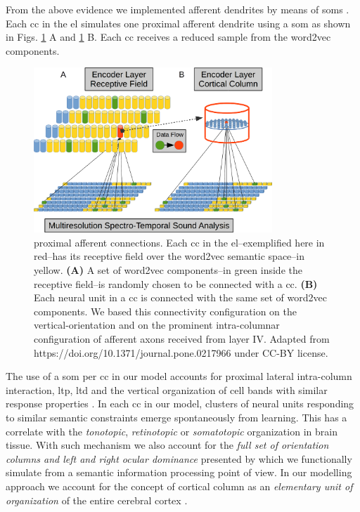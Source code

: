 {From the above evidence we implemented afferent dendrites by means of \glspl{som} \cite{Kohonen:1988:SFT:65669.104428, Kohonen1989SelforganizationAA}.
Each \gls{cc} in the \gls{el} simulates one proximal afferent dendrite using a \gls{som} as shown in Figs. \ref{fig:EncoderProximalConnections} A and \ref{fig:EncoderProximalConnections} B. Each \gls{cc} receives a reduced sample from the word2vec components.

\begin{figure}[ht!]
    \centering
    \includegraphics[width=0.8\textwidth]{EncoderProximalConnections.png}
    \caption{ proximal afferent connections. Each \gls{cc} in the \gls{el}--exemplified here in red--has its receptive field over the word2vec semantic space--in yellow.
    \textbf{(A)} A set of word2vec components--in green inside the receptive field--is randomly chosen to be connected with a \gls{cc}.
    \textbf{(B)} Each neural unit in a \gls{cc} is connected with the same set of word2vec components. We based this connectivity configuration on the vertical-orientation and on the prominent intra-columnar configuration of afferent axons received from layer IV.
    Adapted from https://doi.org/10.1371/journal.pone.0217966 under CC-BY license.}
    \label{fig:EncoderProximalConnections}
\end{figure}

The use of a \gls{som} per \gls{cc} in our model accounts for 
proximal lateral intra-column interaction, \gls{ltp}, \gls{ltd} and
the vertical organization of cell bands with similar response properties \cite{mountcastle_1955,Haueis2016}.
In each \gls{cc} in our model, clusters of neural units responding to similar semantic constraints emerge spontaneously from learning.
This has a correlate with the \emph{tonotopic}, \emph{retinotopic} or \emph{somatotopic} organization in brain tissue.
With such mechanism we also account for the \emph{full set of orientation columns and left and right ocular dominance} presented by \cite{doi:10.1002/cne.901580305} which we functionally simulate from a semantic information processing point of view.
In our modelling approach we account for the concept of cortical column as an \emph{elementary unit of organization} of the entire cerebral cortex \cite{doi:10.1152/jn.1957.20.4.408,Mountcastle1978AnOP,10.1093/brain/120.4.701}.

}
